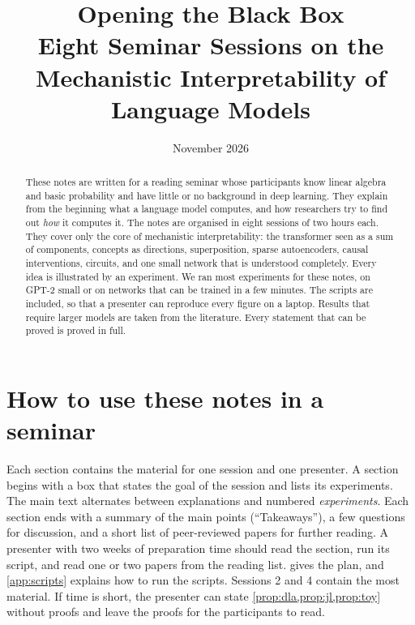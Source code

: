 \documentclass[11pt,a4paper]{article}
\title{\textbf{Opening the Black Box}\\[4pt]
\Large Eight Seminar Sessions on the Mechanistic Interpretability of Language Models}
\author{}
\date{November 2026}
\theoremstyle{plain}
\theoremstyle{definition}
\theoremstyle{remark}
\begin{document}
\maketitle
\vspace{-3.2em}

\begin{abstract}
\noindent
These notes are written for a reading seminar whose participants know linear algebra and basic probability and
have little or no background in deep learning. They explain from the beginning what a language model computes, and
how researchers try to find out \emph{how} it computes it. The notes are organised in eight sessions of two hours
each. They cover only the core of mechanistic interpretability: the transformer seen as a sum of components,
concepts as directions, superposition, sparse autoencoders, causal interventions, circuits, and one small network
that is understood completely. Every idea is illustrated by an experiment. We ran most experiments for these notes,
on GPT-2 small or on networks that can be trained in a few minutes. The scripts are included, so that a presenter
can reproduce every figure on a laptop. Results that require larger models are taken from the literature. Every
statement that can be proved is proved in full.
\end{abstract}

\section*{How to use these notes in a seminar}

Each section contains the material for one session and one presenter. A section begins with a box that states
the goal of the session and lists its experiments. The main text alternates between explanations and numbered
\emph{experiments}. Each section ends with a summary of the main points (``Takeaways''), a few questions for
discussion, and a short list of peer-reviewed papers for further reading. A presenter with two weeks of preparation
time should read the section, run its script, and read one or two papers from the reading list. 
gives the plan, and \cref{app:scripts} explains how to run the scripts. Sessions 2 and 4 contain the most material.
If time is short, the presenter can state \cref{prop:dla,prop:jl,prop:toy} without proofs and leave the proofs for
the participants to read.
\end{document}
